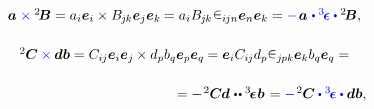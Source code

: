 \begin{otherlanguage}{russian}
\nopagebreak\vspace{-0.1em}\begin{equation*}
\begin{array}{c}
\bm{a} \hspace{.1ex} \mathcolor{blue}{\times} {^2\hspace{-0.16em}\bm{B}} = a_i \bm{e}_i \times B_{\hspace{-0.1ex}j\hspace{-0.1ex}k} \bm{e}_j \bm{e}_k \hspace{-0.1ex} = \tikzmark{BeginVectorCrossTensor} a_i B_{\hspace{-0.1ex}j\hspace{-0.1ex}k} \hspace{.1ex} \levicivita_{i\hspace{-0.1ex}jn} \tikzmark{EndVectorCrossTensor} \bm{e}_n \bm{e}_k = \mathcolor{blue}{-} \hspace{.2ex} \bm{a} \hspace{.15ex} \mathcolor{blue}{\dotp \levicivitatensor \dotp} {^2\!\bm{B}} ,
\\[1.6em]
%
{^2\hspace{-0.05ex}\bm{C}} \mathcolor{blue}{\times} \hspace{-0.1ex} \bm{d} \bm{b} = C_{i\hspace{-0.1ex}j} \bm{e}_i \bm{e}_j \hspace{-0.1ex} \times d_p b_q \bm{e}_p \bm{e}_q \hspace{-0.1ex} = \bm{e}_i C_{i\hspace{-0.1ex}j} d_p \tikzmark{BeginTensorCrossTensor} \levicivita_{j\hspace{-0.1ex}pk} \tikzmark{EndTensorCrossTensor} \bm{e}_k b_q \bm{e}_q =
\\[1.6em]
\hspace{12.5em} =
- \hspace{.2ex} {^2\hspace{-0.05ex}\bm{C}} \hspace{-0.1ex} \bm{d} \hspace{.12ex} \dotdotp \levicivitatensor \hspace{.1ex} \bm{b} \hspace{.2ex} =
\mathcolor{blue}{-} \hspace{.2ex} {^2\hspace{-0.05ex}\bm{C}} \mathcolor{blue}{\dotp \levicivitatensor \dotp} \bm{d} \bm{b},\\
\end{array}
\end{equation*}%

\end{otherlanguage}
